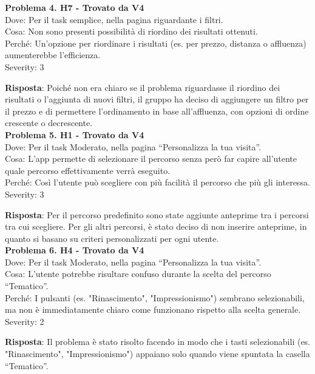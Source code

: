 \documentclass{article}
\begin{document}
\noindent \textbf{Problema 4. H7 - Trovato da V4} \\
Dove: Per il task semplice, nella pagina riguardante i filtri. \\
Cosa: Non sono presenti possibilità di riordino dei risultati ottenuti. \\
Perché: Un’opzione per riordinare i risultati (es. per prezzo, distanza o affluenza) aumenterebbe l’efficienza. \\
Severity: 3

\noindent \textbf{Risposta}: Poiché non era chiaro se il problema riguardasse il riordino dei risultati o l’aggiunta di nuovi filtri, il gruppo ha deciso di aggiungere un filtro per il prezzo e di permettere l'ordinamento in base all’affluenza, con opzioni di ordine crescente o decrescente.\\

\noindent \textbf{Problema 5. H1 - Trovato da V4} \\
Dove: Per il task Moderato, nella pagina “Personalizza la tua visita”. \\
Cosa: L'app permette di selezionare il percorso senza però far capire all’utente quale percorso effettivamente verrà eseguito. \\
Perché: Così l’utente può scegliere con più facilità il percorso che più gli interessa. \\
Severity: 3

\noindent \textbf{Risposta}: Per il percorso predefinito sono state aggiunte anteprime tra i percorsi tra cui scegliere. Per gli altri percorsi, è stato deciso di non inserire anteprime, in quanto si basano su criteri personalizzati per ogni utente.\\

\noindent \textbf{Problema 6. H4 - Trovato da V4} \\
Dove: Per il task Moderato, nella pagina “Personalizza la tua visita”. \\
Cosa: L’utente potrebbe risultare confuso durante la scelta del percorso “Tematico”. \\
Perché: I pulsanti (es. "Rinascimento", "Impressionismo") sembrano selezionabili, ma non è immediatamente chiaro come funzionano rispetto alla scelta generale. \\
Severity: 2

\noindent \textbf{Risposta}: Il problema è stato risolto facendo in modo che i tasti selezionabili (es. "Rinascimento", "Impressionismo") appaiano solo quando viene spuntata la casella “Tematico”.\\
\end{document}
